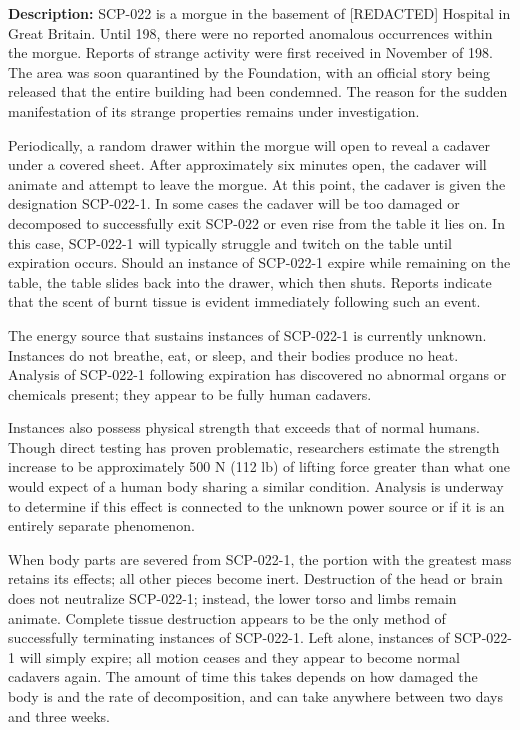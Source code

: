 \textbf{Description:} SCP-022 is a morgue in the basement of [REDACTED] Hospital in Great Britain. Until 198, there were no reported anomalous occurrences within the morgue. Reports of strange activity were first received in November of 198. The area was soon quarantined by the Foundation, with an official story being released that the entire building had been condemned. The reason for the sudden manifestation of its strange properties remains under investigation.

Periodically, a random drawer within the morgue will open to reveal a cadaver under a covered sheet. After approximately six minutes open, the cadaver will animate and attempt to leave the morgue. At this point, the cadaver is given the designation SCP-022-1. In some cases the cadaver will be too damaged or decomposed to successfully exit SCP-022 or even rise from the table it lies on. In this case, SCP-022-1 will typically struggle and twitch on the table until expiration occurs. Should an instance of SCP-022-1 expire while remaining on the table, the table slides back into the drawer, which then shuts. Reports indicate that the scent of burnt tissue is evident immediately following such an event.

The energy source that sustains instances of SCP-022-1 is currently unknown. Instances do not breathe, eat, or sleep, and their bodies produce no heat. Analysis of SCP-022-1 following expiration has discovered no abnormal organs or chemicals present; they appear to be fully human cadavers.

Instances also possess physical strength that exceeds that of normal humans. Though direct testing has proven problematic, researchers estimate the strength increase to be approximately 500 N (112 lb) of lifting force greater than what one would expect of a human body sharing a similar condition. Analysis is underway to determine if this effect is connected to the unknown power source or if it is an entirely separate phenomenon.

When body parts are severed from SCP-022-1, the portion with the greatest mass retains its effects; all other pieces become inert. Destruction of the head or brain does not neutralize SCP-022-1; instead, the lower torso and limbs remain animate. Complete tissue destruction appears to be the only method of successfully terminating instances of SCP-022-1. Left alone, instances of SCP-022-1 will simply expire; all motion ceases and they appear to become normal cadavers again. The amount of time this takes depends on how damaged the body is and the rate of decomposition, and can take anywhere between two days and three weeks.

